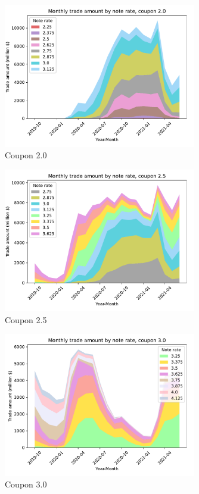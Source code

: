 \documentclass[11pt,a4paper]{article}
\begin{document}
  \pagebreak

\begin{figure}[h]
  \includegraphics[width=0.75\textwidth]{../results/figures/ob_monthly_trade_amount_by_noterate_c20.0_area_legend_colors_left.pdf}
  \caption{Coupon 2.0}
  \end{figure}

\begin{figure}[h]
  \includegraphics[width=0.75\textwidth]{../results/figures/ob_monthly_trade_amount_by_noterate_c25.0_area_legend_colors_left.pdf}
  \caption{Coupon 2.5}
  \end{figure}

  \pagebreak

\begin{figure}[h]
  \includegraphics[width=0.75\textwidth]{../results/figures/ob_monthly_trade_amount_by_noterate_c30.0_area_legend_colors_right.pdf}
  \caption{Coupon 3.0}
  \end{figure}
\end{document}
